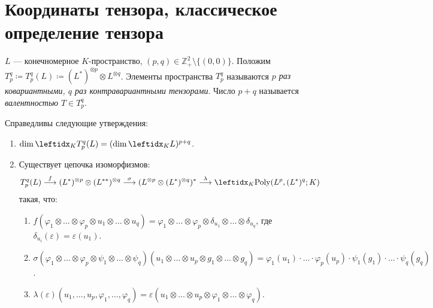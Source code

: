 \section{Координаты тензора, классическое определение тензора}

\begin{defn}
    $L$ --- конечномерное $K$-пространство, $(p, q) \in \mathbb{Z}_+^2 \setminus \{(0, 0)\}$. Положим $T_p^q \coloneqq T_p^q(L) \coloneqq (L^*)^{\otimes p} \otimes L^{\otimes q}$. Элементы пространства $T_p^q$ называются \textit{$p$ раз ковариантными, $q$ раз контравариантными тензорами}. Число $p+q$ называется \textit{валентностью} $T \in T_p^q$. 
\end{defn}

\begin{rem}
    Справедливы следующие утверждения:
    \begin{enumerate}
        \item $\dim \lsub{K}{T_p^q(L)} = (\dim \lsub{K}{L})^{p+q}$.
        \item Существует цепочка изоморфизмов:
        $$T_p^q(L) \stackrel{f}{\longrightarrow} (L^*)^{\otimes p} \otimes (L^{**})^{\otimes q} \stackrel{\sigma}{\longrightarrow} (L^{\otimes p} \otimes (L^*)^{\otimes q})^* \stackrel{\lambda}{\longrightarrow} \lsub{K}{\Poly(L^p, (L^*)^q; K)}$$
        такая, что:
        \begin{enumerate}[label=\arabic*.]
            \item $f(\varphi_1 \otimes \ldots \otimes \varphi_p \otimes u_1 \otimes \ldots \otimes u_q) = \varphi_1 \otimes \ldots \otimes \varphi_p \otimes \delta_{u_1} \otimes \ldots \otimes \delta_{u_q}$, где $\delta_{u_i}(\varepsilon) = \varepsilon(u_1)$.
            \item $\sigma(\varphi_1 \otimes \ldots \otimes \varphi_p \otimes \psi_1 \otimes \ldots \otimes \psi_q)(u_1 \otimes \ldots \otimes u_p \otimes g_1 \otimes \ldots \otimes g_q) = \varphi_1(u_1) \cdot \ldots \cdot \varphi_p(u_p) \cdot \psi_1(g_1) \cdot \ldots \cdot \psi_q(g_q)$.
            \item $\lambda(\varepsilon)(u_1, \ldots, u_p, \varphi_1, \ldots, \varphi_q) = \varepsilon(u_1 \otimes \ldots \otimes u_p \otimes \varphi_1 \otimes \ldots \otimes \varphi_q)$.
        \end{enumerate}
    

\end{enumerate}
\end{rem}
